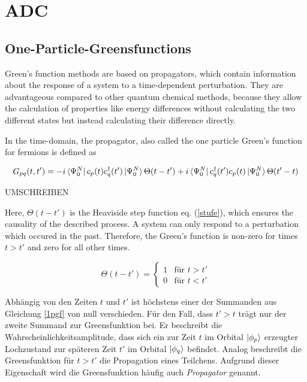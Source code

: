\chapter{\acl{ADC}}
\section{One-Particle-Greensfunctions}\label{greensfkt}

Green's function methods are based on propagators, which contain information
about the response of a system to a time-dependent perturbation.\cite{McWeenyxy}
They are advantageous compared to other quantum chemical methods, because they
allow the calculation of properties like energy differences without calculating
the two different states but instead calculating their difference directly.

In the time-domain, the propagator, also called the one particle Green's function
for fermions is defined as

\begin{equation}\label{1pgf}
G_{pq}(t,t') = -i \bra{\Psi_0^N}c_p(t)c_q^\dagger(t')\ket{\Psi_0^N}\Theta(t-t') +i \bra{\Psi_0^N}c_q^\dagger(t')c_p(t)\ket{\Psi_0^N}\Theta(t'-t)
\end{equation}

UMSCHREIBEN

Here, $\Theta(t-t')$ is the Heaviside step function eq. (\ref{stufe}),
which ensures the causality of the described process. A system can only
respond to a perturbation which occured in the past. Therefore, the Green's
function is non-zero for times $t>t'$ and zero for all other times.

\begin{equation}\label{stufe}
\Theta(t-t') = \begin{cases}
1 & \text{für } t>t'\\
0 & \text{für } t<t'
\end{cases}
\end{equation}

Abhängig von den Zeiten $t$ und $t'$ ist höchstens einer der Summanden aus Gleichung \ref{1pgf} von null verschieden. Für den Fall, dass $t'>t$ trägt nur der zweite Summand zur Greensfunktion bei. Er beschreibt die Wahrscheinlichkeitsamplitude, dass sich ein zur Zeit $t$ im Orbital $\ket{\phi_p}$ erzeugter Lochzustand zur späteren Zeit $t'$ im Orbital $\ket{\phi_q}$ befindet. Analog beschreibt die Greensfunktion für $t>t'$ die Propagation eines Teilchens. Aufgrund dieser Eigenschaft wird die Greensfunktion häufig auch \emph{Propagator} genannt.\cite{nolting7}

